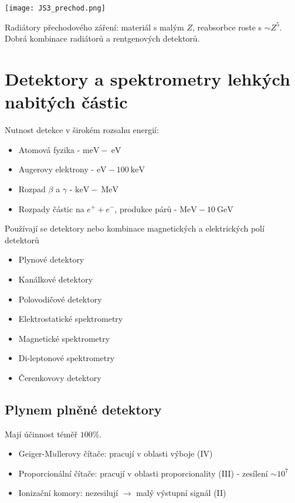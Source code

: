 \documentclass[../../main.tex]{subfiles}
\begin{document}
\begin{center}
	\texttt{[image: JS3\_prechod.png]}
\end{center}

Radiátory přechodového záření: materiál s malým $Z$, reabsorbce roste s $ \sim Z^5$. Dobrá kombinace radiátorů a rentgenových detektorů.

\section{Detektory a spektrometry lehkých nabitých částic}
	
Nutnost detekce v širokém rozsahu energií:
\begin{itemize}
	\item Atomová fyzika - $\mathrm{meV} - ~\mathrm{eV}$
	\item Augerovy elektrony - $\mathrm{eV} - 100 ~\mathrm{keV}$
	\item Rozpad $\beta$ a $\gamma$ - $\mathrm{keV} - ~\mathrm{MeV}$
	\item Rozpady částic na $ e^+ + e^- $, produkce párů - $\mathrm{MeV} - 10 ~\mathrm{GeV}$
\end{itemize}	
Používají se detektory nebo kombinace magnetických a elektrických polí detektorů
\begin{itemize}
	\item Plynové detektory
	\item Kanálkové detektory
	\item Polovodičové detektory
	\item Elektrostatické spektrometry
	\item Magnetické spektrometry
	\item Di-leptonové spektrometry
	\item Čerenkovovy detektory
\end{itemize}	
	
\subsection{Plynem plněné detektory}

Mají účinnost téměř $100 \%$.
\begin{itemize}
     \item Geiger-M$\ddot{u}$llerovy čítače: pracují v oblasti výboje (IV)
     \item Proporcionální čítače: pracují v oblasti proporcionality (III) - zesílení $\sim 10^7$
     \item Ionizační komory: nezesilují $\rightarrow$ malý výstupní signál (II)
\end{itemize}
\end{document}
